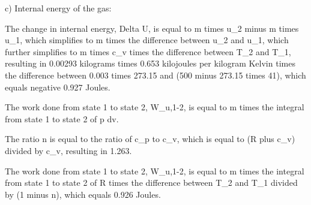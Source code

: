 c) Internal energy of the gas:

The change in internal energy, Delta U, is equal to m times u_2 minus m times u_1,
which simplifies to m times the difference between u_2 and u_1,
which further simplifies to m times c_v times the difference between T_2 and T_1,
resulting in 0.00293 kilograms times 0.653 kilojoules per kilogram Kelvin times the difference between 0.003 times 273.15 and (500 minus 273.15 times 41),
which equals negative 0.927 Joules.

The work done from state 1 to state 2, W_{u,1-2}, is equal to m times the integral from state 1 to state 2 of p dv.

The ratio n is equal to the ratio of c_p to c_v, which is equal to (R plus c_v) divided by c_v,
resulting in 1.263.

The work done from state 1 to state 2, W_{u,1-2}, is equal to m times the integral from state 1 to state 2 of R times the difference between T_2 and T_1 divided by (1 minus n),
which equals 0.926 Joules.